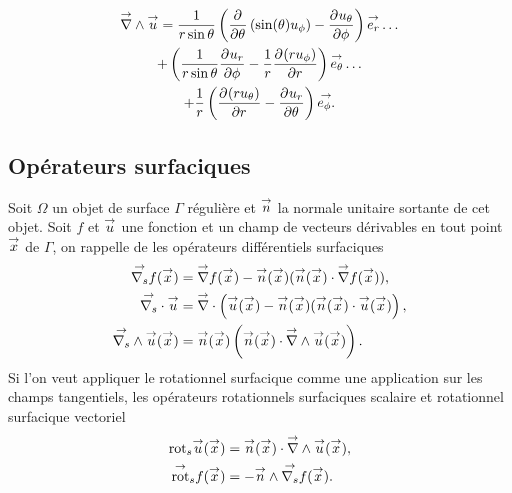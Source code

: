     \begin{multline}
        \vrot \vu = \frac{1}{r\sin\theta}\left(\ddr{\theta}{}\left(\sin(\theta)u_\phi\right) - \ddr{\phi}{u_\theta}\right)\vect{e_r}\dots
        \\
        + \left(\frac{1}{r\sin\theta}\ddr{\phi}{u_r} - \frac{1}{r}\ddr{r}{(ru_\phi)} \right)\vect{e_\theta} \dots
        \\
        + \frac{1}{r}\left(\ddr{r}{(ru_\theta)}-\ddr{\theta}{u_r}\right)\vect{e_\phi.}
    \end{multline}

\subsection{Opérateurs surfaciques}

    Soit \(\Omega\) un objet de surface \(\Gamma\) régulière et \(\vn\) la normale unitaire sortante de cet objet.
    Soit \(f\) et \(\vu\) une fonction et un champ de vecteurs dérivables en tout point \(\vx\) de \(\Gamma\), on rappelle de \cite{nedelec_acoustic_2001} les opérateurs différentiels surfaciques
    \begin{align}
        \vgrads{f}(\vx) &= \vgrad{f}(\vx) - \vn(\vx) (\vn(\vx) \cdot \vgrad{f}(\vx)),
        \\
        \vdivs{\vu} &= \vdiv\left(\vu(\vx) - \vn(\vx) (\vn(\vx) \cdot \vu(\vx)\right),
        \\
        \vrots{\vu}(\vx) &= \vn(\vx)\left(\vn(\vx) \cdot \vrot{\vu}(\vx)\right).
    \end{align}
    Si l'on veut appliquer le rotationnel surfacique comme une application sur les champs tangentiels, les opérateurs rotationnels surfaciques scalaire et rotationnel surfacique vectoriel
    \begin{align}
        \trots{\vu}(\vx) &= \vn(\vx) \cdot \vrot{\vu}(\vx),
        \\
        \tvrots{f}(\vx) &= - \vn \pvect \vgrads f(\vx).
    \end{align}